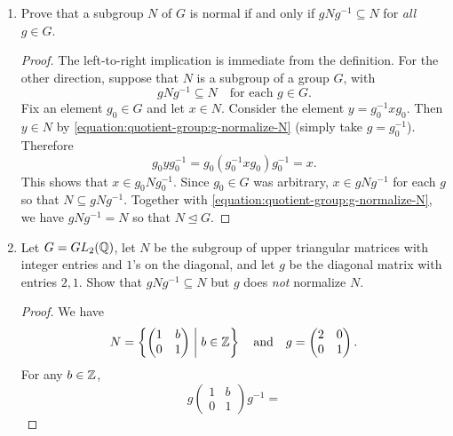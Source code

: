 \begin{enumerate}
\item Prove that a subgroup $N$ of $G$ is normal if and only if
  $gNg^{-1}\subseteq N$ for {\em all} $g\in G$.
  \begin{proof}
    The left-to-right implication is immediate from the
    definition. For the other direction, suppose that $N$ is a
    subgroup of a group $G$, with
    \begin{equation}
      \label{equation:quotient-group:g-normalize-N}
      gNg^{-1}\subseteq N
      \quad\text{for each $g\in G$}.
    \end{equation}
    Fix an element $g_0\in G$ and let $x\in N$. Consider the element
    $y = g_0^{-1}xg_0$. Then $y\in N$ by
    \eqref{equation:quotient-group:g-normalize-N} (simply take
    $g = g_0^{-1}$). Therefore
    \begin{equation*}
      g_0yg_0^{-1} = g_0(g_0^{-1}xg_0)g_0^{-1} = x.
    \end{equation*}
    This shows that $x\in g_0Ng_0^{-1}$. Since $g_0\in G$ was
    arbitrary, $x\in gNg^{-1}$ for each $g$ so that
    $N\subseteq gNg^{-1}$. Together with
    \eqref{equation:quotient-group:g-normalize-N}, we have
    $gNg^{-1} = N$ so that $N\trianglelefteq G$.
  \end{proof}
\item Let $G = GL_2(\mathbb{Q})$, let $N$ be the subgroup of upper triangular
  matrices with integer entries and $1$'s on the diagonal, and let $g$
  be the diagonal matrix with entries $2,1$. Show that
  $gNg^{-1}\subseteq N$ but $g$ does {\em not} normalize $N$.
  \begin{proof}
    We have
    \begin{equation*}
      N = \left\{
        \begin{pmatrix}
          1 & b \\
          0 & 1
        \end{pmatrix}
        \;\middle|\;
        b\in\mathbb{Z}
      \right\}
      \quad\text{and}\quad
      g =
      \begin{pmatrix}
        2 & 0 \\
        0 & 1
      \end{pmatrix}.
    \end{equation*}
    For any $b\in\mathbb{Z}$,
    \begin{equation*}
      g\begin{pmatrix} 1 & b \\ 0 & 1 \end{pmatrix}g^{-1} =

\end{equation*}
\end{proof}
\end{enumerate}
